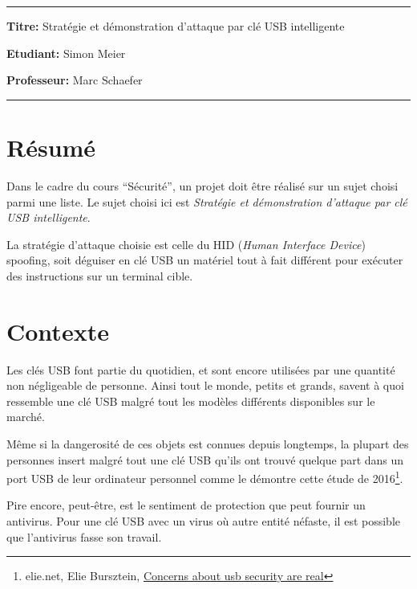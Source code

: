 \documentclass[
  french,
  paper=a4,
  ,captions=tableheading
]{scrartcl}
\begin{document}

\tableofcontents

\newpage

\begin{center}\rule{0.5\linewidth}{0.5pt}\end{center}

\textbf{Titre:} Stratégie et démonstration d'attaque par clé USB
intelligente

\textbf{Etudiant:} Simon Meier

\textbf{Professeur:} Marc Schaefer

\begin{center}\rule{0.5\linewidth}{0.5pt}\end{center}

\hypertarget{ruxe9sumuxe9}{%
\section{Résumé}\label{ruxe9sumuxe9}}

Dans le cadre du cours ``Sécurité'', un projet doit être réalisé
sur un sujet choisi parmi une liste. Le sujet choisi ici est
\emph{Stratégie et démonstration d'attaque par clé USB intelligente}.

La stratégie d'attaque choisie est celle du HID (\emph{Human Interface
Device}) spoofing, soit déguiser en clé USB un matériel tout à fait
différent pour exécuter des instructions sur un terminal cible.

\hypertarget{contexte}{%
\section{Contexte}\label{contexte}}

Les clés USB font partie du quotidien, et sont encore utilisées par une
quantité non négligeable de personne. Ainsi tout le monde, petits et
grands, savent à quoi ressemble une clé USB malgré tout les modèles
différents disponibles sur le marché.

Même si la dangerosité de ces objets est connues depuis longtemps, la
plupart des personnes insert malgré tout une clé USB qu'ils ont trouvé
quelque part dans un port USB de leur ordinateur personnel comme le
démontre cette étude de 2016\footnote{elie.net, Elie Bursztein,
  \href{https://elie.net/blog/security/concerns-about-usb-security-are-real-48-percent-of-people-do-plug-in-usb-drives-found-in-parking-lots/}{Concerns
  about usb security are real}}.

Pire encore, peut-être, est le sentiment de protection que peut fournir
un antivirus. Pour une clé USB avec un virus où autre entité néfaste, il
est possible que l'antivirus fasse son travail.
\end{document}
